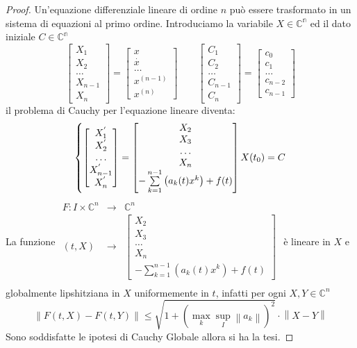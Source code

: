 \begin{proof}
	Un'equazione differenziale lineare di ordine $n$ può essere trasformato in un sistema di equazioni al primo ordine.
	Introduciamo la variabile $X\in\mathbb{C^n}$ ed il dato iniziale $C\in\mathbb{C^n}$
	$$\left[\begin{matrix} X_1\\X_2\\\ldots\\X_{n-1}\\X_n \end{matrix}\right] = \left[\begin{matrix} x\\\overset{\cdot}{x}\\\ldots\\ x^{(n-1)}\\x^{(n)} \end{matrix}\right]\quad\quad\left[\begin{matrix} C_1\\C_2\\\ldots\\C_{n-1}\\C_{n} \end{matrix}\right] = \left[\begin{matrix} c_0\\c_1\\\ldots\\ c_{n-2}\\c_{n-1} \end{matrix}\right]$$
	il problema di Cauchy per l'equazione lineare diventa:
	$$
	\left\{
	\left[\begin{matrix} X_1^{'}\\X_2^{'}\\\ldots\\X_{n-1}^{'}\\X_n^{'} \end{matrix}\right]
	=
	\left[\begin{matrix} X_2\\X_3\\\ldots\\X_{n}\\-\sum\limits_{k=1}^{n-1}\left(a_k(t)x^k\right)+f(t) \end{matrix}\right]
	\\
	X(t_0)=C
	\right.
	$$
	La funzione
	$\begin{array}{rcl} 
	F: I\times\mathbb{C}^n & \to & \mathbb{C}^n \\
	   (t,X) & \to & \left[\begin{matrix} X_2\\X_3\\\ldots\\X_{n}\\-\sum\limits_{k=1}^{n-1}\left(a_k(t)x^k\right)+f(t) \end{matrix}\right] \\ 
	\end{array}$
	è lineare in $X$ e globalmente lipshitziana in $X$ uniformemente in $t$, infatti per ogni $X,Y\in\mathbb{C}^n$
	$$\left\|F(t,X)-F(t,Y)\right\|\le \sqrt{1+\left( \max\limits_k \sup\limits_I \left\|a_k\right\| \right)^2}\cdot\left\|X-Y\right\|$$
	Sono soddisfatte le ipotesi di Cauchy Globale allora si ha la tesi.
\end{proof}

